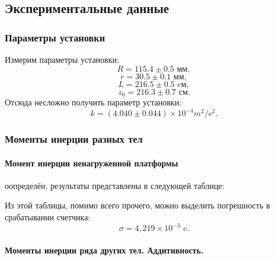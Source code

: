 \documentclass[a4paper, 12pt]{article}%
\begin{document}
\subsection{Экспериментальные данные}
\subsubsection{Параметры установки}
Измерим параметры установки:
\[R=115.4\pm0.5 \text{ мм},\]
\[r=30.5\pm0.1 \text{ мм},\]
\[L=216.5\pm0.5 \text{ cм},\]
\[z_0=216.3\pm0.7 \text{ см}.\]
Отсюда несложно получить параметр установки:
\[k=(4.040\pm0.044)\times 10^{-4}  m^2/c^2.\]
\subsubsection{Моменты инерции разных тел}
\paragraph{Момент инерции ненагруженной платформы}
оопределён, результаты представлены в следующей таблице:
\begin{table}[h]
\end{table}

Из этой таблицы, помимо всего прочего, можно выделить погрешность в срабатывании счетчика:
\[\sigma=4,219\times10^{-3} \text{ c}.\]
\paragraph{Моменты инерции ряда других тел. Аддитивность.}
\end{document}
